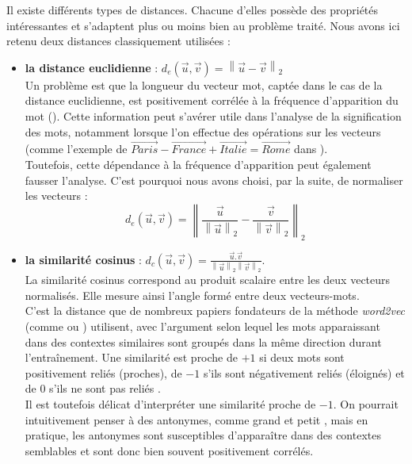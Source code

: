 \documentclass[11pt,french,french]{article}
\providecommand{\tightlist}{%
  \setlength{\parskip}{0pt}
  }
\begin{document}
Il existe différents types de distances. Chacune d'elles possède des propriétés intéressantes et s'adaptent plus ou moins bien au problème traité. Nous avons ici retenu deux distances classiquement utilisées :

\begin{itemize}
\tightlist
\item
  \textbf{la distance euclidienne} : \(d_{e}(\vec{u},\vec{v}) = \left\| \vec{u} - \vec{v} \right\|_2\)\\
  Un problème est que la longueur du vecteur mot, captée dans le cas de la distance euclidienne, est positivement corrélée à la fréquence d'apparition du mot (\cite{Schakel}). Cette information peut s'avérer utile dans l'analyse de la signification des mots, notamment lorsque l'on effectue des opérations sur les vecteurs (comme l'exemple de \(\overrightarrow{Paris} - \overrightarrow{France} + \overrightarrow{Italie} = \overrightarrow{Rome}\) dans \cite{Mikolov}).\\
  Toutefois, cette dépendance à la fréquence d'apparition peut également fausser l'analyse. C'est pourquoi nous avons choisi, par la suite, de normaliser les vecteurs :
  \[ d_{e}(\vec{u},\vec{v}) = \left\| \frac{\vec{u}}{\left\| \vec{u} \right\|_2} - \frac{\vec{v}}{\left\| \vec{v} \right\|_2}  \right\|_2\]
\item
  \textbf{la similarité cosinus} : \(d_{c}(\vec{u}, \vec{v}) = \frac{\vec{u}.\vec{v}}{\left\| \vec{u} \right\|_2 \left\| \vec{v} \right\|_2 }\).\\
  La similarité cosinus correspond au produit scalaire entre les deux vecteurs normalisés. Elle mesure ainsi l'angle formé entre deux vecteurs-mots.\\
  C'est la distance que de nombreux papiers fondateurs de la méthode \emph{word2vec} (comme \cite{Mikolov} ou \cite{Levy}) utilisent, avec l'argument selon lequel les mots apparaissant dans des contextes similaires sont groupés dans la même direction durant l'entraînement.
  Une similarité est proche de \(+1\) si deux mots sont positivement reliés (proches), de \(-1\) s'ils sont négativement reliés (éloignés) et de 0 s'ils ne sont pas \og reliés \fg{}.\\
  Il est toutefois délicat d'interpréter une similarité proche de \(-1\). On pourrait intuitivement penser à des antonymes, comme \og grand \fg{} et \og petit \fg{}, mais en pratique, les antonymes sont susceptibles d'apparaître dans des contextes semblables et sont donc bien souvent positivement corrélés.
\end{itemize}
\end{document}
